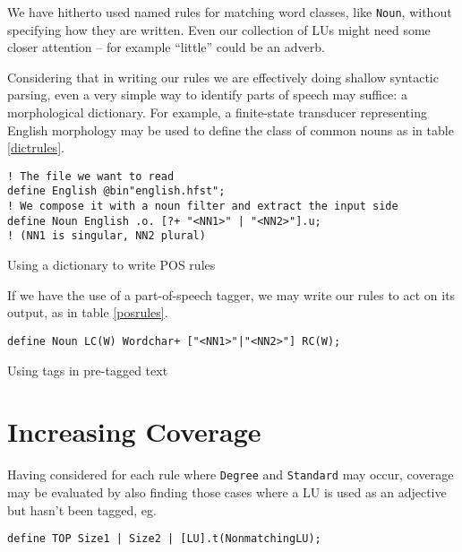 \documentclass{llncs}
\begin{document}
We have hitherto used named rules for matching word classes, like \verb+Noun+,
without specifying how they are written. Even our collection of LUs might need
some closer attention -- for example ``little'' could be an adverb.

Considering that in writing our
rules we are effectively doing shallow syntactic parsing, even a very simple
way to identify parts of speech may suffice: a morphological dictionary.
For example, a finite-state transducer representing English morphology may be
used to define the class of common nouns as in table \ref{dictrules}.

\begin{table}[h]
\small
  \begin{framed}
\begin{verbatim}
! The file we want to read
define English @bin"english.hfst";
! We compose it with a noun filter and extract the input side
define Noun English .o. [?+ "<NN1>" | "<NN2>"].u;
! (NN1 is singular, NN2 plural)
\end{verbatim}
\end{framed}
  \normalsize
  \caption{Using a dictionary to write POS rules}
  \label{dictrules}
  \end{table}

If we have the use of a part-of-speech tagger, we may write our rules to act
on its output, as in table \ref{posrules}.

\begin{table}[h]
  \small
  \begin{framed}
\begin{verbatim}
define Noun LC(W) Wordchar+ ["<NN1>"|"<NN2>"] RC(W);
\end{verbatim}
\end{framed}
  \normalsize
  \caption{Using tags in pre-tagged text}
  \label{posrules}
  \end{table}

\section{Increasing Coverage}
Having considered for each rule where \verb+Degree+ and \verb+Standard+ may occur, coverage may be evaluated by also finding those cases where a LU is used as an adjective but hasn't been tagged, eg.

\small
\begin{verbatim}
define TOP Size1 | Size2 | [LU].t(NonmatchingLU);
\end{verbatim}
\normalsize
\end{document}
